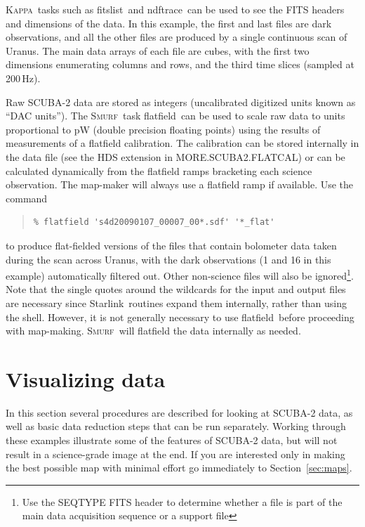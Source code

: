 \documentclass[twoside,11pt]{article}
\newcommand{\htmladdnormallink}[2]{#1}
\newcommand{\xref}[3]{#1}
\newcommand{\xlabel}[1]{}
\renewcommand{\_}{\texttt{\symbol{95}}}
\newenvironment{myquote}{\begin{quote}\begin{small}}{\end{small}\end{quote}}
\newcommand{\starlink}{\htmladdnormallink{Starlink}{http://starlink.jach.hawaii.edu}}
\newcommand{\Kappa}{\xref{\textsc{Kappa}}{sun95}{}}
\newcommand{\smurf}{\xref{\textsc{Smurf}}{sun258}{}}
\newcommand{\task}[1]{\textsf{#1}}
\newcommand{\flatfield}{\xref{\task{flatfield}}{sun258}{FLATFIELD}}
\newcommand{\fitslist}{\xref{\task{fitslist}}{sun95}{FITSLIST}}
\newcommand{\ndftrace}{\xref{\task{ndftrace}}{sun95}{NDFTRACE}}
\begin{document}
\Kappa\ tasks such as \fitslist\ and \ndftrace\ can be used to see the
FITS headers and dimensions of the data. In this example, the first
and last files are dark observations, and all the other files are
produced by a single continuous scan of Uranus. The main data arrays
of each file are cubes, with the first two dimensions enumerating
columns and rows, and the third time slices (sampled at 200\,Hz).

Raw SCUBA-2 data are stored as integers (uncalibrated digitized
units known as ``DAC units''). The \smurf\ task \flatfield\ can be used to scale raw data to
units proportional to pW (double precision floating points) using the results of
measurements of a flatfield calibration. The calibration can be stored
internally in the data file (see the HDS extension in
MORE.SCUBA2.FLATCAL) or can be calculated dynamically from the
flatfield ramps bracketing each science observation. The map-maker
will always use a flatfield ramp if available. Use the command

\begin{myquote}
\begin{verbatim}
% flatfield 's4d20090107_00007_00*.sdf' '*_flat'
\end{verbatim}
\end{myquote}
%
to produce flat-fielded versions of the files that contain bolometer
data taken during the scan across Uranus, with the dark observations
(1 and 16 in this example) automatically filtered out. Other
non-science files will also be ignored\footnote{Use the SEQ\_TYPE FITS
  header to determine whether a file is part of the main data
  acquisition sequence or a support file}. Note that the single quotes
around the wildcards for the input and output files are necessary
since \starlink\ routines expand them internally, rather than using
the shell. However, it is not generally necessary to use \flatfield\
before proceeding with map-making. \smurf\ will flatfield the data
internally as needed.

\section{\xlabel{time_series}Visualizing data}
\label{sec:visual}

In this section several procedures are described for looking at
SCUBA-2 data, as well as basic data reduction steps that can be run
separately. Working through these examples illustrate some of the
features of SCUBA-2 data, but will not result in a science-grade image
at the end. If you are interested only in making the best possible map
with minimal effort go immediately to Section~\ref{sec:maps}.
\end{document}
